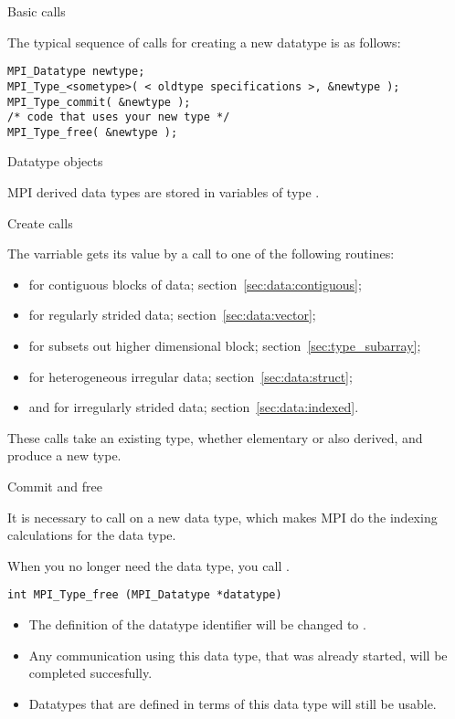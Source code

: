  {Basic calls}
\label{sec:data-commit}

The typical sequence of calls for creating a new datatype is as follows:
\begin{lstlisting}
MPI_Datatype newtype;
MPI_Type_<sometype>( < oldtype specifications >, &newtype );
MPI_Type_commit( &newtype );
/* code that uses your new type */
MPI_Type_free( &newtype );
\end{lstlisting}

 {Datatype objects}
\label{sec:mpi-datatype}

MPI derived data types are stored in variables of type
.
%

 {Create calls}

The  varriable gets its value by a call to
one of the following routines:
\begin{itemize}
\item {} for contiguous blocks of
  data; section~\ref{sec:data:contiguous};
\item {} for regularly strided data;
  section~\ref{sec:data:vector};
\item {} for subsets out higher
  dimensional block; section~\ref{sec:type_subarray};
\item {} for heterogeneous irregular data;
  section~\ref{sec:data:struct};
\item {} and
   for irregularly strided data;
  section~\ref{sec:data:indexed}.
\end{itemize}
These calls take an existing type, whether elementary or also derived,
and produce a new type.

 {Commit and free}

It is necessary to call  on a new data
type, which makes MPI do the indexing calculations for the data type.
%

When you no longer
need the data type, you call .
\begin{lstlisting}
int MPI_Type_free (MPI_Datatype *datatype)
\end{lstlisting}
\begin{itemize}
\item The definition of the datatype identifier will be changed to
  .
\item Any communication using this data type, that was already
  started, will be completed succesfully.
\item Datatypes that are defined in terms of this data type will still
  be usable.
\end{itemize}

